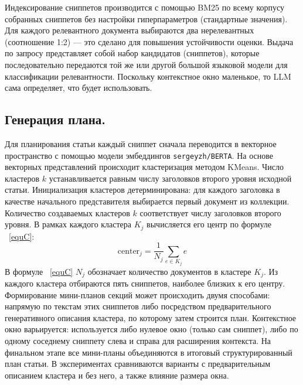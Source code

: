 \documentclass{article}
\theoremstyle{definition}
\theoremstyle{plain}
\begin{document}
Индексирование сниппетов производится с помощью BM25 по всему корпусу собранных сниппетов без настройки гиперпараметров (стандартные значения).
Для каждого релевантного документа выбираются два нерелевантных (соотношение 1:2) — это сделано для повышения устойчивости оценки.
Выдача по запросу представляет собой набор кандидатов (сниппетов), которые последовательно передаются той же или другой большой языковой модели для классификации релевантности.
Поскольку контекстное окно маленькое, то LLM сама определяет, что будет использовать.

\subsection*{Генерация плана.}
Для планирования статьи каждый сниппет сначала переводится в векторное пространство с помощью модели эмбеддингов \texttt{sergeyzh/BERTA}. 
На основе векторных представлений происходит кластеризация методом KMeans. Число кластеров \(k\) устанавливается равным числу заголовков второго уровня исходной статьи. 
Инициализация кластеров детерминирована: для каждого заголовка в качестве начального представителя выбирается первый документ из коллекции.
Количество создаваемых кластеров $k$ соответствует числу заголовков второго уровня. 
В рамках каждого кластера $K_j$ вычисляется его центр по формуле ~\eqref{equC}:
\begin{equation}\label{equC}
\text{center}_j = \frac{1}{N_j} \sum_{e \in K_j} e
\end{equation}
В формуле ~\eqref{equC} $N_j$ обозначает количество документов в кластере $K_j$.
Из каждого кластера отбираются пять сниппетов, наиболее близких к его центру.
Формирование мини-планов секций может происходить двумя способами: напрямую по текстам этих сниппетов либо посредством предварительного генеративного описания кластера, по которому затем строится план.
Контекстное окно варьируется: используется либо нулевое окно (только сам сниппет), либо по одному соседнему сниппету слева и справа для расширения контекста. 
На финальном этапе все мини-планы объединяются в итоговый структурированный план статьи. 
В экспериментах сравниваются варианты с предварительным описанием кластера и без него, а также влияние размера окна. 
\end{document}
